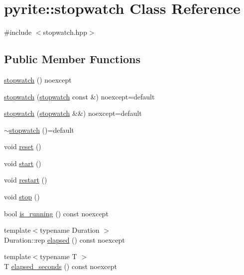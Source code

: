 \hypertarget{classpyrite_1_1stopwatch}{}\section{pyrite\+:\+:stopwatch Class Reference}
\label{classpyrite_1_1stopwatch}


{\ttfamily \#include $<$stopwatch.\+hpp$>$}

\subsection*{Public Member Functions}
\begin{DoxyCompactItemize}
\item 
\mbox{\hyperlink{classpyrite_1_1stopwatch_a685312010147a137543d0a65220153e6}{stopwatch}} () noexcept
\item 
\mbox{\hyperlink{classpyrite_1_1stopwatch_a5a833844590a54c1027b572fbef8dcb6}{stopwatch}} (\mbox{\hyperlink{classpyrite_1_1stopwatch}{stopwatch}} const \&) noexcept=default
\item 
\mbox{\hyperlink{classpyrite_1_1stopwatch_ab640070338c43dbde8c8d0471bd415d7}{stopwatch}} (\mbox{\hyperlink{classpyrite_1_1stopwatch}{stopwatch}} \&\&) noexcept=default
\item 
\mbox{\hyperlink{classpyrite_1_1stopwatch_a6371ecaf8fe6d96fa39e477e3a82e7fc}{$\sim$stopwatch}} ()=default
\item 
void \mbox{\hyperlink{classpyrite_1_1stopwatch_ac6dd6a9c17ec2f2afc6b99cf1be86e04}{reset}} ()
\item 
void \mbox{\hyperlink{classpyrite_1_1stopwatch_ae1f6baec67daf518cf4d6bfbaab43cb1}{start}} ()
\item 
void \mbox{\hyperlink{classpyrite_1_1stopwatch_a3fc39be2c2271eb57b9d8d30f5632dea}{restart}} ()
\item 
void \mbox{\hyperlink{classpyrite_1_1stopwatch_acfacb195247f465f29cedaa9e8686e82}{stop}} ()
\item 
bool \mbox{\hyperlink{classpyrite_1_1stopwatch_add72890f54bc7554c32b9588ac761eed}{is\+\_\+running}} () const noexcept
\item 
{\footnotesize template$<$typename Duration $>$ }\\Duration\+::rep \mbox{\hyperlink{classpyrite_1_1stopwatch_a8032beb577019ab16594273aaaa97eb0}{elapsed}} () const noexcept
\item 
{\footnotesize template$<$typename T $>$ }\\T \mbox{\hyperlink{classpyrite_1_1stopwatch_a2925d97a9c0ec2ae7b4ebbea0e15e5eb}{elapsed\+\_\+seconds}} () const noexcept

\end{DoxyCompactItemize}
